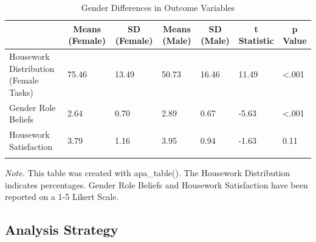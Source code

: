 \documentclass[
  man,floatsintext]{apa6}
\begin{document}
\begin{table}[tbp]

\begin{center}
\begin{threeparttable}

\caption{\label{tab:unnamed-chunk-47}Gender Differences in Outcome Variables}

\tiny{

\begin{tabular}{lllllll}
\toprule
 & \multicolumn{1}{c}{Means (Female)} & \multicolumn{1}{c}{SD (Female)} & \multicolumn{1}{c}{Means (Male)} & \multicolumn{1}{c}{SD (Male)} & \multicolumn{1}{c}{t Statistic} & \multicolumn{1}{c}{p Value}\\
\midrule
Housework Distribution (Female Tasks) & 75.46 & 13.49 & 50.73 & 16.46 & 11.49 & <.001\\
Gender Role Beliefs & 2.64 & 0.70 & 2.89 & 0.67 & -5.63 & <.001\\
Housework Satisfaction & 3.79 & 1.16 & 3.95 & 0.94 & -1.63 & 0.11\\
\bottomrule
\addlinespace
\end{tabular}

}

\begin{tablenotes}[para]
\normalsize{\textit{Note.} This table was created with apa\_table().  
  The Housework Distribution indicates percentages. Gender Role Beliefs and Housework Satisfaction have been reported on a 1-5 Likert Scale.}
\end{tablenotes}

\end{threeparttable}
\end{center}

\end{table}

\hypertarget{analysis-strategy}{%
\subsection{Analysis Strategy}\label{analysis-strategy}}
\end{document}
